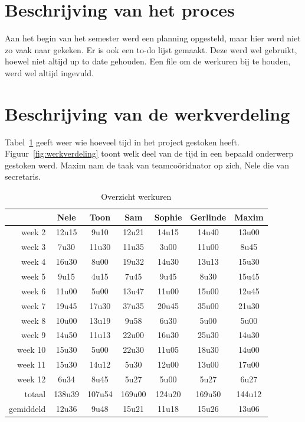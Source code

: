 \documentclass[eind]{penoverslag}
\begin{document}
\section{Beschrijving van het proces}
\label{Assec:beschrijvingProces}
Aan het begin van het semester werd een planning opgesteld, maar hier werd niet zo vaak naar gekeken. Er is ook een to-do lijst gemaakt. Deze werd wel gebruikt, hoewel niet altijd up to date gehouden. Een file om de werkuren bij te houden, werd wel altijd ingevuld.\\


\section{Beschrijving van de werkverdeling}
\label{Assec:werkverdeling}

Tabel~\ref{tab:werkuren} geeft weer wie hoeveel tijd in het project gestoken heeft. Figuur~\ref{fig:werkverdeling} toont welk deel van de tijd in een bepaald onderwerp gestoken werd.
Maxim nam de taak van teamco\"oridnator op zich, Nele die van secretaris.

\begin{table}[!hb]
\begin{center}
    \begin{tabular}{ r | c  c  c  c  c  c}
     & Nele & Toon & Sam & Sophie & Gerlinde & Maxim \\ \hline
    week 2 & 12u15 & 9u10 & 12u21 & 14u15 & 14u40 & 13u00\\
   	week 3 & 7u30 & 11u30 & 11u35 & 3u00 & 11u00 & 8u45\\
	week 4 & 16u30 & 8u00 & 19u32 & 14u30 & 13u13 & 15u30\\
	week 5 & 9u15 & 4u15 & 7u45 & 9u45 & 8u30 & 15u45\\
	week 6 & 11u00 & 5u00 & 13u47 & 11u00 & 15u00 & 12u45\\
	week 7 & 19u45 & 17u30 & 37u35 & 20u45 & 35u00 & 21u30\\
	week 8 & 10u00 & 13u19 & 9u58 & 6u30 & 5u00 & 5u00\\
	week 9 & 14u50 & 11u13 & 22u00 & 16u30 & 25u30 & 14u30\\
	week 10 & 15u30 & 5u00 & 22u30 & 11u05 & 18u30 & 14u00\\
	week 11 & 15u30 & 14u12 & 5u30 & 12u00 & 13u00 & 17u00\\
	week 12 & 6u34 & 8u45 & 5u27 & 5u00 & 5u27 & 6u27\\ \hline
	totaal & 138u39 & 107u54 & 169u00 & 124u20 & 169u50 & 144u12 \\
	gemiddeld & 12u36 & 9u48 & 15u21 & 11u18 & 15u26 & 13u06
    \end{tabular}
    \caption{Overzicht werkuren}
    \label{tab:werkuren}
\end{center}
\end{table}
\end{document}
